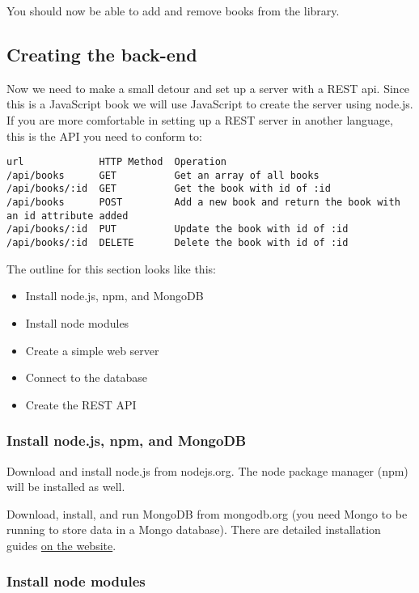 \documentclass[9pt]{book}
\begin{document}
You should now be able to add and remove books from the library.

\subsection{Creating the back-end}\label{creating-the-back-end}

Now we need to make a small detour and set up a server with a REST api.
Since this is a JavaScript book we will use JavaScript to create the
server using node.js. If you are more comfortable in setting up a REST
server in another language, this is the API you need to conform to:

\begin{verbatim}
url             HTTP Method  Operation
/api/books      GET          Get an array of all books
/api/books/:id  GET          Get the book with id of :id
/api/books      POST         Add a new book and return the book with an id attribute added
/api/books/:id  PUT          Update the book with id of :id
/api/books/:id  DELETE       Delete the book with id of :id
\end{verbatim}

The outline for this section looks like this:

\begin{itemize}
\itemsep1pt\parskip0pt
\item
  Install node.js, npm, and MongoDB
\item
  Install node modules
\item
  Create a simple web server
\item
  Connect to the database
\item
  Create the REST API
\end{itemize}

\subsubsection{Install node.js, npm, and
MongoDB}\label{install-node.js-npm-and-mongodb}

Download and install node.js from nodejs.org. The node package manager
(npm) will be installed as well.

Download, install, and run MongoDB from mongodb.org (you need Mongo to
be running to store data in a Mongo database). There are detailed
installation guides
\href{http://docs.mongodb.org/manual/installation/}{on the website}.

\subsubsection{Install node modules}\label{install-node-modules}
\end{document}
